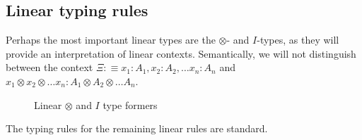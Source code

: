 \subsection{Linear typing rules}
Perhaps the most important linear types are the $\otimes$- and $I$-types, as they will provide an interpretation of linear contexts. Semantically, we will not distinguish between the context $\Xi :\equiv x_1 : A_1, x_2 : A_2, \dots x_n : A_n$ and $x_1 \otimes x_2 \otimes \dots x_n : A_1 \otimes A_2 \otimes \dots A_n$. 
\begin{figure}[H]
\caption{Linear $\otimes$ and $I$ type formers}
\label{tensor}
\end{figure}
The typing rules for the remaining linear rules are standard.
